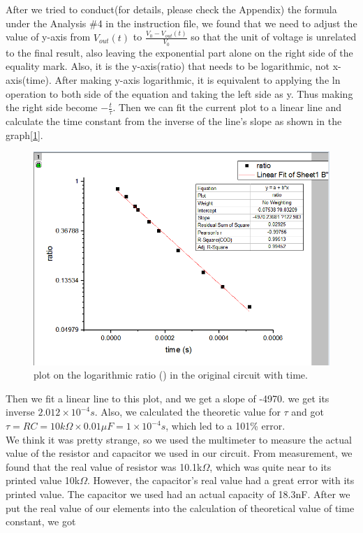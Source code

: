 \phantom{ } After we tried to conduct(for details, please check the Appendix) the formula under the Analysis \#4 in the instruction file, we found that we need to adjust the value of y-axis from $V_{out}(t)$ to $\frac{V_0 - V_{out}(t)}{V_0}$ so that the unit of voltage is unrelated to the final result, also leaving the exponential part alone on the right side of the equality mark. Also, it is the y-axis(ratio) that needs to be logarithmic, not x-axis(time). After making y-axis logarithmic, it is equivalent to applying the ln operation to both side of the equation and taking the left side as y. Thus making the right side become $-\frac{t}{\tau}$. Then we can fit the current plot to a linear line and calculate the time constant from the inverse of the line's slope as shown in the graph[\ref{fig:2.2}].\\
\begin{figure}[htbp]
	\centering %
	\includegraphics[width=\linewidth]{images/2_2.PNG} %
	\caption{plot on the logarithmic ratio ({\tiny }) in the original circuit with time.} %
	\label{fig:2.2} %
\end{figure}
\phantom{ } Then we fit a linear line to this plot, and we get a slope of -4970.
we get its inverse $2.012\times10^{-4}s$. Also, we calculated the theoretic value for $\tau$ and got 
$\tau = RC = 10k\Omega \times 0.01\mu F = 1\times10^{-4}s$, which led to a 101\% error.\\
We think it was pretty strange, so we used the multimeter to measure the actual value of the resistor and capacitor we used in our circuit. From measurement, we found that the real value of resistor was 10.1k$\Omega$, which was quite near to its printed value 10k$\Omega$. However, the capacitor's real value had a great error with its printed value. The capacitor we used had an actual capacity of 18.3nF. After we put the real value of our elements into the calculation of theoretical value of time constant, we got \\
